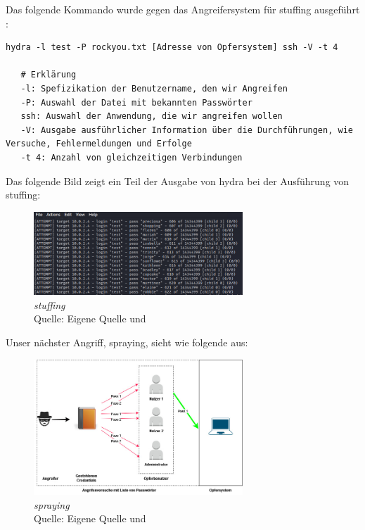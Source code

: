 Das folgende Kommando wurde gegen das Angreifersystem für \gls{stuffing} ausgeführt \citep{kali_hydra}:
{
\begin{Verbatim}[frame=single]
   hydra -l test -P rockyou.txt [Adresse von Opfersystem] ssh -V -t 4

   # Erklärung
   -l: Spefizikation der Benutzername, den wir Angreifen
   -P: Auswahl der Datei mit bekannten Passwörter
   ssh: Auswahl der Anwendung, die wir angreifen wollen
   -V: Ausgabe ausführlicher Information über die Durchführungen, wie Versuche, Fehlermeldungen und Erfolge
   -t 4: Anzahl von gleichzeitigen Verbindungen
\end{Verbatim}
}

Das folgende Bild zeigt ein Teil der Ausgabe von \gls{hydra} bei der Ausführung von \gls{stuffing}:
\begin{figure}[H]
   \centering
   \includegraphics[width=0.7\textwidth]{assets/stuffing_kali.png}
   \caption{\textit{\gls{stuffing}}\\Quelle: Eigene Quelle und \citep{Nguyen_stuffing}}
   \centering
\end{figure}

Unser nächster Angriff, \gls{spraying}, sieht wie folgende aus:
\begin{figure}[H]
   \centering
   \includegraphics[width=0.7\textwidth]{assets/Spraying.jpg}
   \caption{\textit{\gls{spraying}}\\Quelle: Eigene Quelle und \citep{Swathi_spraxy}}
   \centering
\end{figure}

